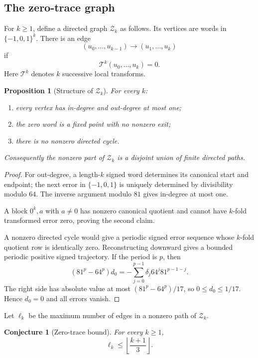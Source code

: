 \documentclass[11pt,reqno]{amsart}
\numberwithin{equation}{section}
\newtheorem{proposition}[theorem]{Proposition}
\newtheorem{conjecture}[theorem]{Conjecture}
\theoremstyle{definition}
\theoremstyle{remark}
\newcommand{\cT}{\mathcal T}
\newcommand{\cZ}{\mathcal Z}
\begin{document}
\subsection{The zero-trace graph}

For $k\ge1$, define a directed graph $\cZ_k$ as follows.  Its vertices are words in $\{-1,0,1\}^k$.  There is an edge
\[
 (u_0,\ldots,u_{k-1})
 \longrightarrow
 (u_1,\ldots,u_k)
\]
if
\begin{equation}\label{eq:edge}
 \cT^k(u_0,\ldots,u_k)=0.
\end{equation}
Here $\cT^k$ denotes $k$ successive local transforms.

\begin{proposition}[Structure of $\cZ_k$]\label{prop:Zstructure}
For every $k$:
\begin{enumerate}[label=\textup{(\alph*)}]
\item every vertex has in-degree and out-degree at most one;
\item the zero word is a fixed point with no nonzero exit;
\item there is no nonzero directed cycle.
\end{enumerate}
Consequently the nonzero part of $\cZ_k$ is a disjoint union of finite directed paths.
\end{proposition}

\begin{proof}
For out-degree, a length-$k$ signed word determines its canonical start and endpoint; the next error in $\{-1,0,1\}$ is uniquely determined by divisibility modulo $64$.  The inverse argument modulo $81$ gives in-degree at most one.

A block $0^k,a$ with $a\ne0$ has nonzero canonical quotient and cannot have $k$-fold transformed error zero, proving the second claim.

A nonzero directed cycle would give a periodic signed error sequence whose $k$-fold quotient row is identically zero.  Reconstructing downward gives a bounded periodic positive signed trajectory.  If the period is $p$, then
\[
 (81^p-64^p)d_0
 =-\sum_{j=0}^{p-1}\delta_j64^j81^{p-1-j}.
\]
The right side has absolute value at most $(81^p-64^p)/17$, so $0\le d_0\le1/17$.  Hence $d_0=0$ and all errors vanish.
\end{proof}

Let $\ell_k$ be the maximum number of edges in a nonzero path of $\cZ_k$.

\begin{conjecture}[Zero-trace bound]\label{conj:ZT}
For every $k\ge1$,
\begin{equation}\label{eq:ZT}
 \ell_k\le\left\lfloor\frac{k+1}{3}\right\rfloor.
\end{equation}
\end{conjecture}
\end{document}
